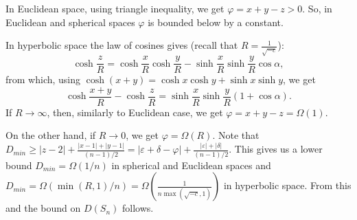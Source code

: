 \documentclass{article} %
\newcommand{\ph}[1]{\textcolor{blue}{#1}}
\newcommand{\lt}[1]{\textcolor{red}{#1}}
\begin{document}
In Euclidean space, using triangle inequality, we get  $\varphi = x + y - z > 0$. So, in Euclidean and spherical spaces $\varphi$ is bounded below by a constant.

In hyperbolic space the law of cosines gives 
(recall that $R = \frac{1}{\sqrt{-c}}$):
\[
\cosh \frac{z}{R} = \cosh \frac{x}{R} \cosh \frac{y}{R} - \sinh \frac{x}{R} \sinh \frac{y}{R} \cos \alpha,
\]
from which, using $\cosh(x+y) =\cosh x\cosh y+\sinh x\sinh y$, we get 
\[
\cosh \frac{x+y}{R} - \cosh \frac{z}{R} = \sinh \frac{x}{R} \sinh \frac{y}{R} (1 + \cos \alpha). %
\]
If $R \to \infty$, then, similarly to Euclidean case, we get $\varphi = x + y - z = \Omega(1)$. 

On the other hand, if $R \to 0$, we get $\varphi = \Omega(R)$.
Note that $D_{min} \ge |z-2| + \frac{|x-1| + |y-1|}{(n-1)/2} =  |\varepsilon + \delta - \varphi| + \frac{|\varepsilon| + |\delta|}{(n-1)/2}$. This gives us a lower bound $D_{min} = \Omega(1/n)$ in spherical and Euclidean spaces and 
$D_{min} = \Omega(\min(R,1)/n) = \Omega\left(\frac{1}{n\max\left(\sqrt{-c},1\right)}\right)$ in hyperbolic space.
From this and  the bound on $D(S_n)$ follows.
\end{document}
